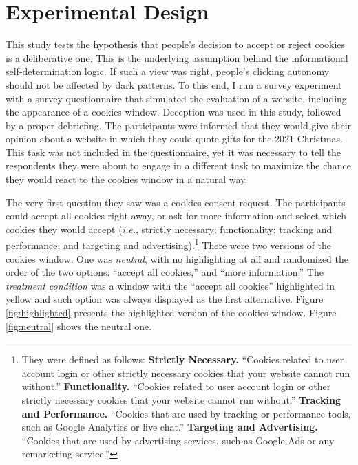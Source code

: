 \documentclass[
  11pt,
  letterpaper,
]{article}
\begin{document}
\hypertarget{experimental-design}{%
\section{Experimental Design}\label{experimental-design}}

This study tests the hypothesis that people's decision to accept or reject cookies is a deliberative one. This is the underlying assumption behind the informational self-determination logic. If such a view was right, people's clicking autonomy should not be affected by dark patterns. To this end, I run a survey experiment with a survey questionnaire that simulated the evaluation of a website, including the appearance of a cookies window. Deception was used in this study, followed by a proper debriefing. The participants were informed that they would give their opinion about a website in which they could quote gifts for the 2021 Christmas. This task was not included in the questionnaire, yet it was necessary to tell the respondents they were about to engage in a different task to maximize the chance they would react to the cookies window in a natural way.

The very first question they saw was a cookies consent request. The participants could accept all cookies right away, or ask for more information and select which cookies they would accept (\emph{i.e.}, strictly necessary; functionality; tracking and performance; and targeting and advertising).\footnote{They were defined as follows: \textbf{Strictly Necessary.} ``Cookies related to user account login or other strictly necessary cookies that your website cannot run without.'' \textbf{Functionality.} ``Cookies related to user account login or other strictly necessary cookies that your website cannot run without.'' \textbf{Tracking and Performance.} ``Cookies that are used by tracking or performance tools, such as Google Analytics or live chat.'' \textbf{Targeting and Advertising.} ``Cookies that are used by advertising services, such as Google Ads or any remarketing service.''} There were two versions of the cookies window. One was \emph{neutral}, with no highlighting at all and randomized the order of the two options: ``accept all cookies,'' and ``more information.'' The \emph{treatment condition} was a window with the ``accept all cookies'' highlighted in yellow and such option was always displayed as the first alternative. Figure \ref{fig:highlighted} presents the highlighted version of the cookies window. Figure \ref{fig:neutral} shows the neutral one.
\end{document}
